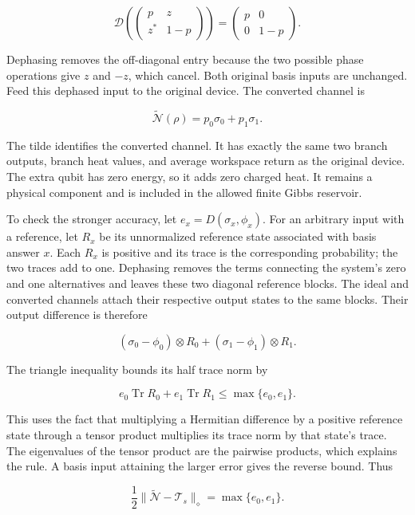 \documentclass[11pt,letterpaper]{article}
\begin{document}
\[\mathcal{D}\left( \begin{pmatrix}
p & z \\
z^{*} & 1 - p
\end{pmatrix} \right) = \begin{pmatrix}
p & 0 \\
0 & 1 - p
\end{pmatrix}.\]

Dephasing removes the off-diagonal entry because the two possible phase operations give \(z\) and \(- z\), which cancel. Both original basis inputs are unchanged. Feed this dephased input to the original device. The converted channel is

\[\widetilde{\mathcal{N}}(\rho) = p_{0}\sigma_{0} + p_{1}\sigma_{1}.\]

The tilde identifies the converted channel. It has exactly the same two branch outputs, branch heat values, and average workspace return as the original device. The extra qubit has zero energy, so it adds zero charged heat. It remains a physical component and is included in the allowed finite Gibbs reservoir.

To check the stronger accuracy, let \(e_{x} = D\left( \sigma_{x},\phi_{x} \right)\). For an arbitrary input with a reference, let \(R_{x}\) be its unnormalized reference state associated with basis answer \(x\). Each \(R_{x}\) is positive and its trace is the corresponding probability; the two traces add to one. Dephasing removes the terms connecting the system's zero and one alternatives and leaves these two diagonal reference blocks. The ideal and converted channels attach their respective output states to the same blocks. Their output difference is therefore

\[\left( \sigma_{0} - \phi_{0} \right) \otimes R_{0} + \left( \sigma_{1} - \phi_{1} \right) \otimes R_{1}.\]

The triangle inequality bounds its half trace norm by

\[e_{0}\operatorname{Tr} R_{0} + e_{1}\operatorname{Tr} R_{1} \leq \max\{ e_{0},e_{1}\}.\]

This uses the fact that multiplying a Hermitian difference by a positive reference state through a tensor product multiplies its trace norm by that state's trace. The eigenvalues of the tensor product are the pairwise products, which explains the rule. A basis input attaining the larger error gives the reverse bound. Thus

\[\frac{1}{2} \lVert \widetilde{\mathcal{N}} - \mathcal{T}_{s}\rVert_{\diamond} = \max\{ e_{0},e_{1}\}.\]
\end{document}
